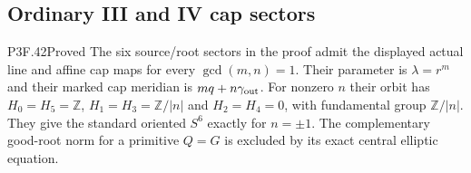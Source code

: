 \subsection{Ordinary III and IV cap sectors}

\begin{statement}{P3F.42}{Proved}
The six source/root sectors in the proof admit the displayed actual line and affine cap maps for every $\gcd(m,n)=1$. Their parameter is $\lambda=r^m$ and their marked cap meridian is $mq+n\gamma_{\rm out}$. For nonzero $n$ their orbit has $H_0=H_5=\mathbb Z$, $H_1=H_3=\mathbb Z/|n|$ and $H_2=H_4=0$, with fundamental group $\mathbb Z/|n|$. They give the standard oriented $S^6$ exactly for $n=\pm1$. The complementary good-root norm for a primitive $Q=G$ is excluded by its exact central elliptic equation.
\end{statement}
